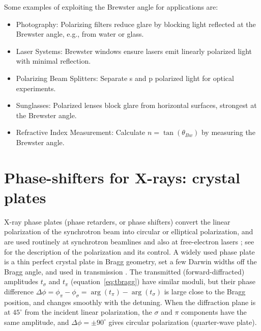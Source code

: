 \documentclass{iucr}
\begin{document}
Some examples of exploiting the Brewster angle for applications are:
\begin{itemize}
    \item Photography: Polarizing filters reduce glare by blocking light reflected at the Brewster angle, e.g., from water or glass.
    \item Laser Systems: Brewster windows ensure lasers emit linearly polarized light with minimal reflection.
    \item Polarizing Beam Splitters: Separate s and p polarized light for optical experiments.
    \item Sunglasses: Polarized lenses block glare from horizontal surfaces, strongest at the Brewster angle.
    \item Refractive Index Measurement: Calculate $n=\tan(\theta_{Bw})$ by measuring the Brewster angle.
\end{itemize}



\section{Phase-shifters for X-rays: crystal plates}\label{sec:phasesifters}

X-ray phase plates (phase retarders, or phase shifters) convert the linear polarization of the synchrotron beam into circular or elliptical polarization, and are used routinely at synchrotron beamlines \cite{Freeland2002,Bouchenoire2003,Bouchenoire2012,Francoual2013} and also at free-electron lasers \cite{Suzuki2014}; see \cite{Detlefs2012,Suzuki2023} for the description of the polarization and its control. A widely used phase plate is a thin perfect crystal plate in Bragg geometry, set a few Darwin widths off the Bragg angle, and used in transmission \cite{hirano1993nim,PolarizationDraft}. The transmitted (forward-diffracted) amplitudes $t_\sigma$ and $t_\pi$ (equation~\ref{eq:tbragg}) have similar moduli, but their phase difference $\Delta\phi=\phi_\pi-\phi_\sigma=\arg(t_\pi)-\arg(t_\sigma)$ is large close to the Bragg position, and changes smoothly with the detuning. When the diffraction plane is at $45^\circ$ from the incident linear polarization, the $\sigma$ and $\pi$ components have the same amplitude, and $\Delta\phi=\pm90^\circ$ gives circular polarization (quarter-wave plate).
\end{document}
